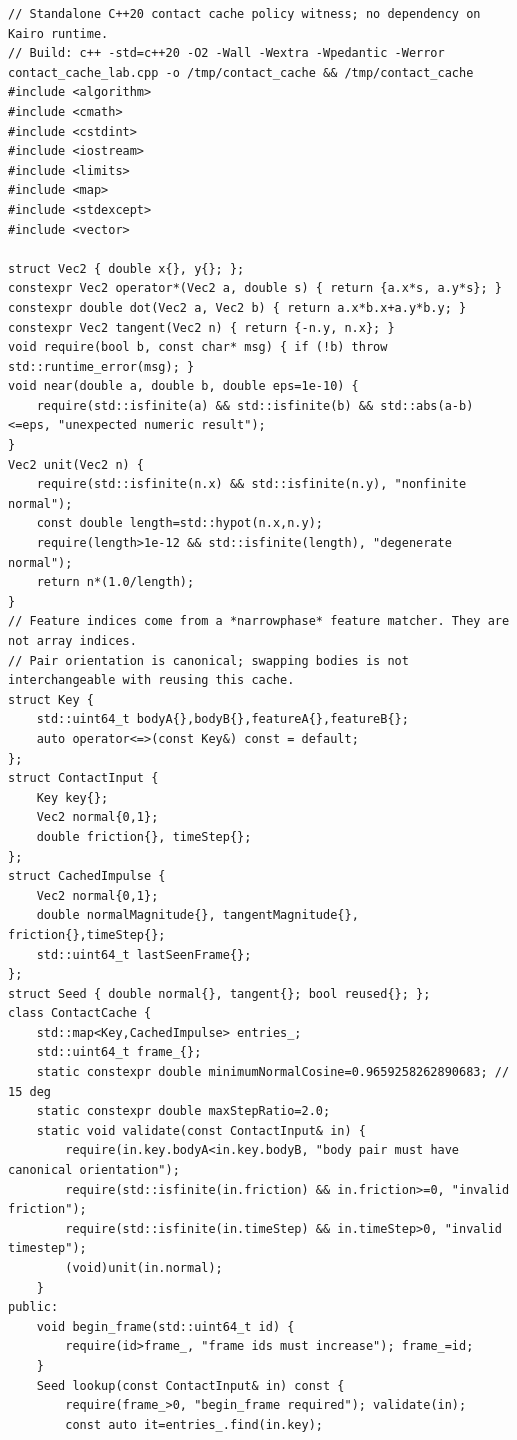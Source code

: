 \begin{verbatim}
// Standalone C++20 contact cache policy witness; no dependency on Kairo runtime.
// Build: c++ -std=c++20 -O2 -Wall -Wextra -Wpedantic -Werror contact_cache_lab.cpp -o /tmp/contact_cache && /tmp/contact_cache
#include <algorithm>
#include <cmath>
#include <cstdint>
#include <iostream>
#include <limits>
#include <map>
#include <stdexcept>
#include <vector>

struct Vec2 { double x{}, y{}; };
constexpr Vec2 operator*(Vec2 a, double s) { return {a.x*s, a.y*s}; }
constexpr double dot(Vec2 a, Vec2 b) { return a.x*b.x+a.y*b.y; }
constexpr Vec2 tangent(Vec2 n) { return {-n.y, n.x}; }
void require(bool b, const char* msg) { if (!b) throw std::runtime_error(msg); }
void near(double a, double b, double eps=1e-10) {
    require(std::isfinite(a) && std::isfinite(b) && std::abs(a-b)<=eps, "unexpected numeric result");
}
Vec2 unit(Vec2 n) {
    require(std::isfinite(n.x) && std::isfinite(n.y), "nonfinite normal");
    const double length=std::hypot(n.x,n.y);
    require(length>1e-12 && std::isfinite(length), "degenerate normal");
    return n*(1.0/length);
}
// Feature indices come from a *narrowphase* feature matcher. They are not array indices.
// Pair orientation is canonical; swapping bodies is not interchangeable with reusing this cache.
struct Key {
    std::uint64_t bodyA{},bodyB{},featureA{},featureB{};
    auto operator<=>(const Key&) const = default;
};
struct ContactInput {
    Key key{};
    Vec2 normal{0,1};
    double friction{}, timeStep{};
};
struct CachedImpulse {
    Vec2 normal{0,1};
    double normalMagnitude{}, tangentMagnitude{}, friction{},timeStep{};
    std::uint64_t lastSeenFrame{};
};
struct Seed { double normal{}, tangent{}; bool reused{}; };
class ContactCache {
    std::map<Key,CachedImpulse> entries_;
    std::uint64_t frame_{};
    static constexpr double minimumNormalCosine=0.9659258262890683; // 15 deg
    static constexpr double maxStepRatio=2.0;
    static void validate(const ContactInput& in) {
        require(in.key.bodyA<in.key.bodyB, "body pair must have canonical orientation");
        require(std::isfinite(in.friction) && in.friction>=0, "invalid friction");
        require(std::isfinite(in.timeStep) && in.timeStep>0, "invalid timestep");
        (void)unit(in.normal);
    }
public:
    void begin_frame(std::uint64_t id) {
        require(id>frame_, "frame ids must increase"); frame_=id;
    }
    Seed lookup(const ContactInput& in) const {
        require(frame_>0, "begin_frame required"); validate(in);
        const auto it=entries_.find(in.key);

\end{verbatim}
